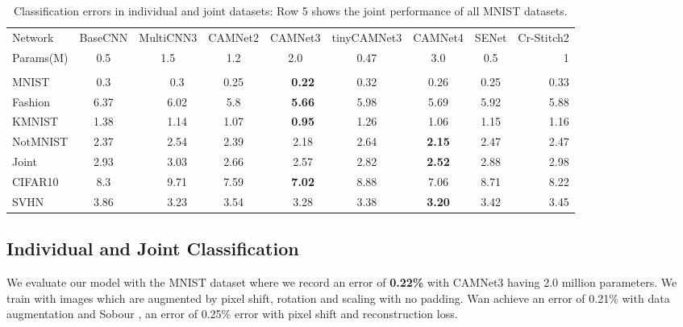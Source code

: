 \documentclass[10pt,twocolumn,letterpaper]{article}
\begin{document}
\begin{table*}[t]
	\caption{Classification errors in individual and joint datasets: Row 5 shows the joint performance of all MNIST datasets.}
	\vspace{-0.2in}
	\label{tab:classi}
	\begin{center}
\renewcommand{\tabcolsep}{0.8mm}
		\begin{tabular}[width=\columnwidth]{@{}lcccccccccr@{}}
			\toprule
			
			Network       & BaseCNN    	&\multicolumn{2}{c}{MultiCNN3}  & CAMNet2  &\multicolumn{2}{c}{CAMNet3}  &tinyCAMNet3 & CAMNet4  &SENet  &Cr-Stitch2\\
			Params(M) &0.5 &\multicolumn{2}{c}{1.5} &1.2 &\multicolumn{2}{c}{2.0} &0.47 &3.0 &0.5 &1 \\
			\midrule
			&       &\color{red}{No Aug.}&   &      &\color{red}{No Aug.}  & & & & & \\
			MNIST     	&0.3 	&\color{red}{0.48} &0.3   &0.25  &\color{red}{0.53} &\textbf{0.22} &0.32 &0.26   &0.25  &0.33\\
			Fashion   	    &6.37	&\color{red}{6.53} &6.02  &5.8   &\color{red}{7.0} &\textbf{5.66}    &5.98 &5.69   &5.92  &5.88\\
			KMNIST      	    &1.38	&\color{red}{2.73} &1.14  &1.07  &\color{red}{2.52} &\textbf{0.95} &1.26 &1.06   &1.15  &1.16\\
			NotMNIST         &2.37   &\color{red}{3.1} &2.54   &2.39  &\color{red}{3.38} &2.18              &2.64 &\textbf{2.15}  &2.47  &2.47\\
			\midrule
			Joint       &2.93   &\color{red}{4.17} &3.03  &2.66  &\color{red}{3.84} &2.57 &2.82 & \textbf{2.52} &2.88  &2.98\\
			\midrule
			CIFAR10      &8.3 & &9.71 &7.59 & &\textbf{7.02}  &8.88 &7.06  &8.71  &8.22\\
			SVHN         &3.86 & &3.23 &3.54 & &3.28  &3.38 &\textbf{3.20}  &3.42  &3.45\\
\bottomrule
		\end{tabular}
	\end{center}
	\vspace{-0.1in}
\end{table*}


\subsection{Individual and Joint Classification}
\label{ss:ind_data}
\vspace{-0.05in}
We evaluate our model with the  MNIST dataset where we record an error of \textbf{0.22\%} with CAMNet3 having 2.0 million parameters. We train with images which are augmented by pixel shift, rotation and scaling with no padding. Wan \etal\cite{dropconnet} achieve an error of 0.21\% with data augmentation and Sobour \etal\cite{sabour2017dynamic}, an error of 0.25\% error with pixel shift and reconstruction loss. 
\end{document}

